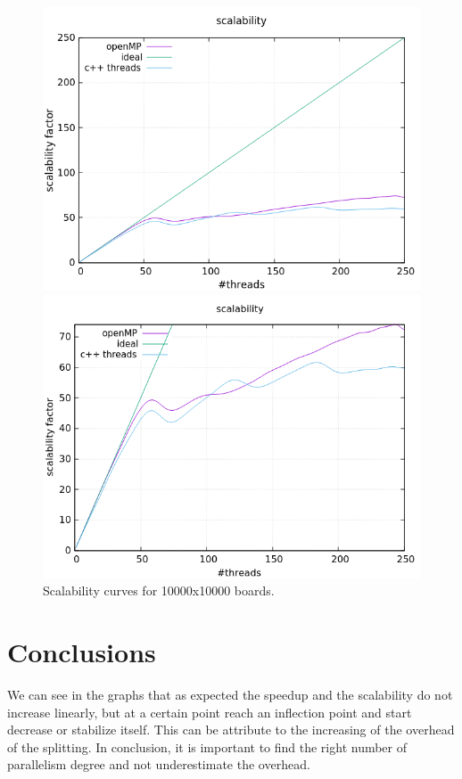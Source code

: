 \documentclass[a4paper,10pt]{article}
\begin{document}
	\begin{figure}[H]
		\centering
		\begin{minipage}[t]{0.55\linewidth}
			\includegraphics[width=\linewidth]{BenchMarkGOL/scalability/10000/graph10000_scal.png}
		\end{minipage}%
		\begin{minipage}[t]{0.55\linewidth}
			\includegraphics[width=\linewidth]{BenchMarkGOL/scalability/10000/graph10000_scal_zoom.png}
		\end{minipage}
		\caption{Scalability curves for 10000x10000 boards.}
		\label{10000s}
	\end{figure}
\section{Conclusions}
We can see in the graphs that as expected the speedup and the scalability do not increase linearly, but at a certain point reach an inflection point and start decrease or stabilize itself. This can be attribute to the increasing of the overhead of the splitting. In conclusion, it is important to find the right number of parallelism degree and not underestimate the overhead.
\end{document}
